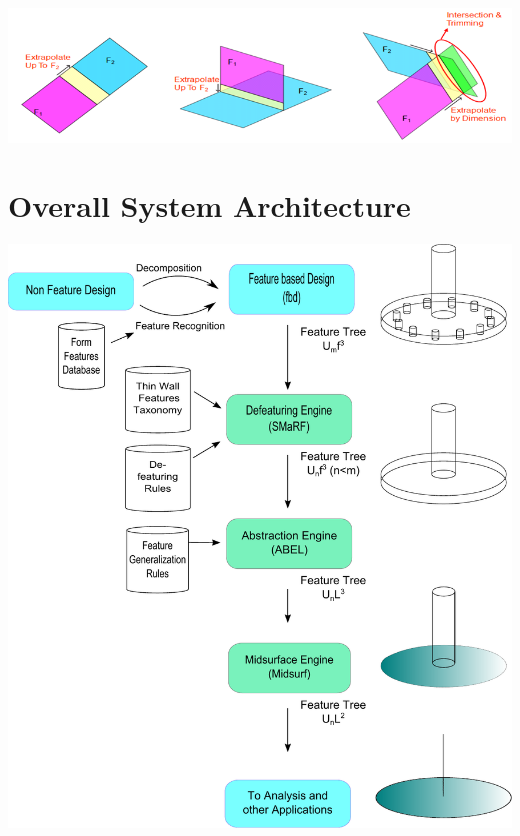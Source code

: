\includegraphics[width=0.9\linewidth]{../Common/images/ExtendTrim}
\vspace{-1em}
		
\section{Overall System Architecture}		
\centering \includegraphics[height=0.6\linewidth]{../Common/images/SystemArchitectureNoColor.pdf}

%
%
%
%


